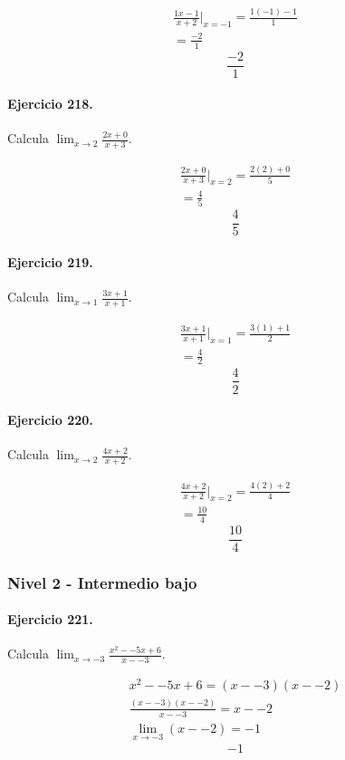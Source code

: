 \documentclass[11pt,a4paper]{article}
\begin{document}
\[
\begin{aligned}
\frac{1x-1}{x+2}\Big|_{x=-1}=\frac{1(-1)-1}{1}\\
=\frac{-2}{1}
\end{aligned}
\]
\[\boxed{\frac{-2}{1}}\]


\paragraph{Ejercicio 218.} Calcula $\displaystyle\lim_{x\to 2}\frac{2x+0}{x+3}$. 

\[
\begin{aligned}
\frac{2x+0}{x+3}\Big|_{x=2}=\frac{2(2)+0}{5}\\
=\frac{4}{5}
\end{aligned}
\]
\[\boxed{\frac{4}{5}}\]


\paragraph{Ejercicio 219.} Calcula $\displaystyle\lim_{x\to 1}\frac{3x+1}{x+1}$. 

\[
\begin{aligned}
\frac{3x+1}{x+1}\Big|_{x=1}=\frac{3(1)+1}{2}\\
=\frac{4}{2}
\end{aligned}
\]
\[\boxed{\frac{4}{2}}\]


\paragraph{Ejercicio 220.} Calcula $\displaystyle\lim_{x\to 2}\frac{4x+2}{x+2}$. 

\[
\begin{aligned}
\frac{4x+2}{x+2}\Big|_{x=2}=\frac{4(2)+2}{4}\\
=\frac{10}{4}
\end{aligned}
\]
\[\boxed{\frac{10}{4}}\]


\newpage

\subsubsection*{Nivel 2 - Intermedio bajo}

\paragraph{Ejercicio 221.} Calcula $\displaystyle\lim_{x\to -3}\frac{x^2--5x+6}{x--3}$. 

\[
\begin{aligned}
x^2--5x+6=(x--3)(x--2)\\
\frac{(x--3)(x--2)}{x--3}=x--2\\
\lim_{x\to -3}(x--2)=-1
\end{aligned}
\]
\[\boxed{-1}\]
\end{document}
